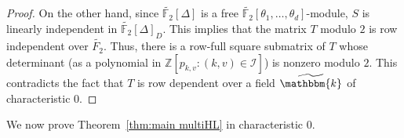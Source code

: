 \begin{proof}
On the other hand, since $\widetilde{\mathbb{F}_2}[\Delta]$ is a free $\widetilde{\mathbb{F}_2}[\theta_1,\ldots,\theta_d]$-module, $S$ is linearly independent in $\widetilde{\mathbb{F}_2}[\Delta]_D$.
This implies that the matrix $T$ modulo $2$ is row independent over $\widetilde{F_2}$.
Thus, there is a row-full square submatrix of $T$ whose determinant (as a polynomial in $\mathbb{Z}[p_{k,v}:(k,v) \in \mathcal{I}]$) is nonzero modulo $2$. 
This contradicts the fact that $T$ is row dependent over a field $\widetilde{\mathbbm{k}}$ of characteristic $0$.
\end{proof}
We now prove Theorem~\ref{thm:main multiHL} in characteristic $0$.
